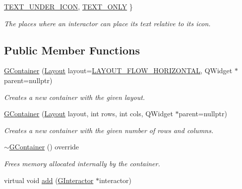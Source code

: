 \begin{DoxyCompactItemize}
\mbox{\hyperlink{classsgl_1_1GInteractor_a8e0d441725a81d2bbdebbea09078260eaa88490f63d8de68d44c83bdb2ecde3b3}{T\+E\+X\+T\+\_\+\+U\+N\+D\+E\+R\+\_\+\+I\+C\+ON}}, 
\mbox{\hyperlink{classsgl_1_1GInteractor_a8e0d441725a81d2bbdebbea09078260ea39a6f388a30ac4fefb6eb13e846bc9f2}{T\+E\+X\+T\+\_\+\+O\+N\+LY}}
 \}
\begin{DoxyCompactList}\small\item\em The places where an interactor can place its text relative to its icon. \end{DoxyCompactList}\end{DoxyCompactItemize}
\subsection*{Public Member Functions}
\begin{DoxyCompactItemize}
\item 
\mbox{\hyperlink{classsgl_1_1GContainer_a09fc5a49b2ea0bc895fbf2772c311325}{G\+Container}} (\mbox{\hyperlink{classsgl_1_1GContainer_a1b7da28ed84c0763e8f92cde2df4799b}{Layout}} layout=\mbox{\hyperlink{classsgl_1_1GContainer_a1b7da28ed84c0763e8f92cde2df4799bac89a811e02b929a18f7f34e7d3bebd63}{L\+A\+Y\+O\+U\+T\+\_\+\+F\+L\+O\+W\+\_\+\+H\+O\+R\+I\+Z\+O\+N\+T\+AL}}, Q\+Widget $\ast$parent=nullptr)
\begin{DoxyCompactList}\small\item\em Creates a new container with the given layout. \end{DoxyCompactList}\item 
\mbox{\hyperlink{classsgl_1_1GContainer_a042cb94e18801664efa748e8a8fa74c1}{G\+Container}} (\mbox{\hyperlink{classsgl_1_1GContainer_a1b7da28ed84c0763e8f92cde2df4799b}{Layout}} layout, int rows, int cols, Q\+Widget $\ast$parent=nullptr)
\begin{DoxyCompactList}\small\item\em Creates a new container with the given number of rows and columns. \end{DoxyCompactList}\item 
\mbox{\hyperlink{classsgl_1_1GContainer_a45b3c0c0cc9c78097c024ca842978692}{$\sim$\+G\+Container}} () override
\begin{DoxyCompactList}\small\item\em Frees memory allocated internally by the container. \end{DoxyCompactList}\item 
virtual void \mbox{\hyperlink{classsgl_1_1GContainer_a6f99b7c841256dbdc5acaafbbca4e685}{add}} (\mbox{\hyperlink{classsgl_1_1GInteractor}{G\+Interactor}} $\ast$interactor)

\end{DoxyCompactItemize}
